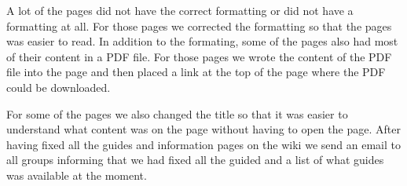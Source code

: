 A lot of the pages did not have the correct formatting or did not have a formatting at all. For those pages we corrected the formatting so that the pages was easier to read. In addition to the formating, some of the pages also had most of their content in a PDF file. For those pages we wrote the content of the PDF file into the page and then placed a link at the top of the page where the PDF could be downloaded.

For some of the pages we also changed the title so that it was easier to understand what content was on the page without having to open the page.
After having fixed all the guides and information pages on the wiki we send an email to all groups informing that we had fixed all the guided and a list of what guides was available at the moment.

